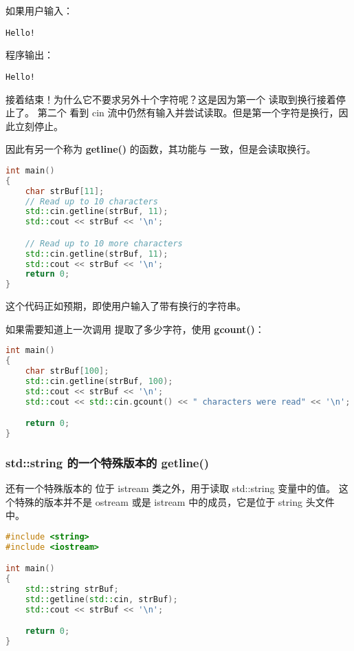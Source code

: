 \documentclass[../../LearnCpp.tex]{subfiles}
\begin{document}
如果用户输入：

\begin{lstlisting}
Hello!
\end{lstlisting}

程序输出：

\begin{lstlisting}
Hello!
\end{lstlisting}

接着结束！为什么它不要求另外十个字符呢？这是因为第一个  读取到换行接着停止了。
第二个  看到 cin 流中仍然有输入并尝试读取。但是第一个字符是换行，因此立刻停止。

因此有另一个称为 \textbf{getline()} 的函数，其功能与  一致，但是会读取换行。

\begin{lstlisting}[language=C++]
int main()
{
    char strBuf[11];
    // Read up to 10 characters
    std::cin.getline(strBuf, 11);
    std::cout << strBuf << '\n';

    // Read up to 10 more characters
    std::cin.getline(strBuf, 11);
    std::cout << strBuf << '\n';
    return 0;
}
\end{lstlisting}

这个代码正如预期，即使用户输入了带有换行的字符串。

如果需要知道上一次调用  提取了多少字符，使用 \textbf{gcount()}：

\begin{lstlisting}[language=C++]
int main()
{
    char strBuf[100];
    std::cin.getline(strBuf, 100);
    std::cout << strBuf << '\n';
    std::cout << std::cin.gcount() << " characters were read" << '\n';

    return 0;
}
\end{lstlisting}

\subsubsection*{std::string 的一个特殊版本的 getline()}

还有一个特殊版本的  位于 istream 类之外，用于读取 std::string 变量中的值。
这个特殊的版本并不是 ostream 或是 istream 中的成员，它是位于 string 头文件中。

\begin{lstlisting}[language=C++]
#include <string>
#include <iostream>

int main()
{
    std::string strBuf;
    std::getline(std::cin, strBuf);
    std::cout << strBuf << '\n';

    return 0;
}
\end{lstlisting}
\end{document}

